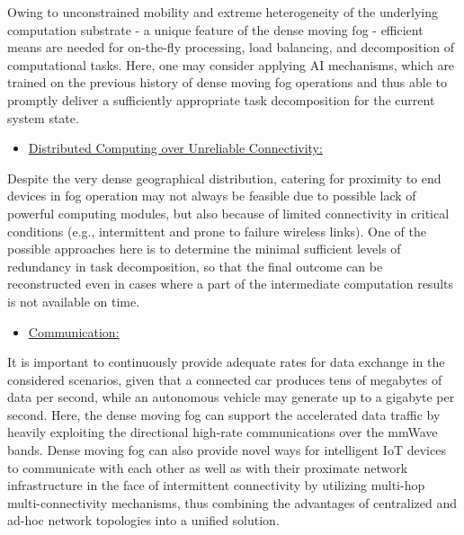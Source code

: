 \documentclass[11pt]{article}
\begin{document}
Owing to unconstrained mobility and extreme heterogeneity of the underlying computation substrate - a unique feature of the dense moving fog - efficient means are needed for on-the-fly processing, load balancing, and decomposition of computational tasks. Here, one may consider applying AI mechanisms, which are trained on the previous history of dense moving fog operations and thus able to promptly deliver a sufficiently appropriate task decomposition for the current system state.

\begin{itemize}
\item {\large \uline{Distributed Computing over Unreliable Connectivity:}}
\end{itemize}

Despite the very dense geographical distribution, catering for proximity to end devices in fog operation may not always be feasible due to possible lack of powerful computing modules, but also because of limited connectivity in critical conditions (e.g., intermittent and prone to failure wireless links). One of the possible approaches here is to determine the minimal sufficient levels of redundancy in task decomposition, so that the final outcome can be reconstructed even in cases where a part of the intermediate computation results is not available on time.

\begin{itemize}
\item {\large \uline{Communication:}}
\end{itemize}

It is important to continuously provide adequate rates for data exchange in the considered scenarios, given that a connected car produces tens of megabytes of data per second, while an autonomous vehicle may generate up to a gigabyte per second. Here, the dense moving fog can support the accelerated data traffic by heavily exploiting the directional high-rate communications over the mmWave bands. Dense moving fog can also provide novel ways for intelligent IoT devices to communicate with each other as well as with their proximate network infrastructure in the face of intermittent connectivity by utilizing multi-hop multi-connectivity mechanisms, thus combining the advantages of centralized and ad-hoc network topologies into a unified solution.



\newpage

\section*{}
\end{document}

